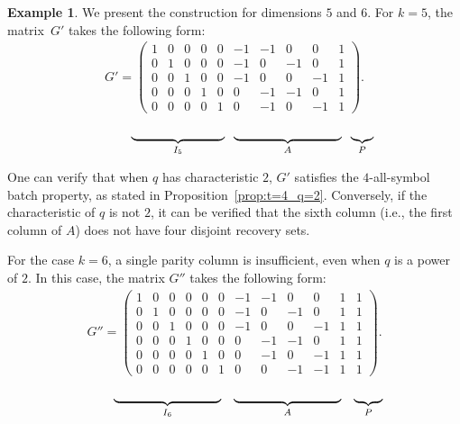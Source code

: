 \documentclass[11pt,a4paper]{article}
\theoremstyle{definition}
\newtheorem{example}[theorem]{Example}
\begin{document}
\begin{example}\label{Ex:t=4}
We present the construction for dimensions $5$ and $6$. For $k=5$, the matrix~$G'$ takes the following form:
\begin{align}
G' =
\left(
\begin{array}{ccccc|cccc|c}
1 & 0 & 0 & 0 & 0 &  -1 & -1 & 0 & 0 & 1 \\
    0 & 1 & 0 & 0 & 0  & -1 & 0 & -1 & 0 & 1 \\
     0 & 0 & 1 & 0 & 0  & -1 & 0 & 0 & -1 & 1 \\
      0 & 0 & 0 & 1 & 0  & 0 & -1 & -1 & 0 & 1 \\
       0 & 0 & 0 & 0 & 1  & 0 & -1 & 0 & -1 & 1  
\end{array}
\right).
\end{align}
\vspace{-0.7cm}
\[
\hspace{1cm}
\underbrace{\hspace{2.6cm}}_{I_5} 
\hspace{0.2cm}
\underbrace{\hspace{3cm}}_{A}
\hspace{0.2cm}
\underbrace{\hspace{-90cm}}_{P}
\]

One can verify that when $q$ has characteristic $2$, 
$G'$ satisfies the $4$-all-symbol batch property, as stated 
in Proposition~\ref{prop:t=4_q=2}. Conversely, if the 
characteristic of $q$ is not $2$, it can be verified that 
the sixth column (i.e., the first column of $A$) does not have 
four disjoint recovery sets.

For the case $k=6$, a single parity column is insufficient, even when $q$ is a power of $2$. In this case, the matrix $G''$ takes the following form:
\begin{align}
G'' =
\left(
\begin{array}{cccccc|cccc|cc}
1 & 0 & 0 & 0 & 0 &  0&-1 & -1 & 0 & 0 & 1 & 1\\
    0 & 1 & 0 & 0 & 0 &0 & -1 & 0 & -1 & 0 & 1 & 1\\
     0 & 0 & 1 & 0 & 0 & 0 & -1 & 0 & 0 & -1 & 1 & 1\\
      0 & 0 & 0 & 1 & 0  & 0 & 0 & -1 & -1 & 0 & 1 & 1\\
       0 & 0 & 0 & 0 & 1  & 0 & 0 & -1 & 0 & -1 & 1 & 1\\
       0 & 0 & 0 & 0 & 0  & 1 & 0 & 0 & -1 & -1 & 1 & 1
\end{array}
\right).
\end{align}
\vspace{-0.7cm}
\[
\hspace{0.8cm}
\underbrace{\hspace{3cm}}_{I_6} 
\hspace{0.3cm}
\underbrace{\hspace{3cm}}_{A}
\hspace{0.3cm}
\underbrace{\hspace{0.8cm}}_{P}
\]
\end{example}
\end{document}

